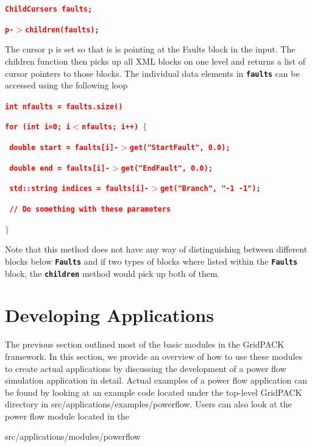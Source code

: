 \documentclass[12pt]{report} %
\begin{document}
\textcolor{red}{\texttt{\textbf{ChildCursors faults;}}}

\textcolor{red}{\texttt{\textbf{p-$\boldsymbol{\mathrm{>}}$children(faults);}}}

The cursor p is set so that is is pointing at the Faults block in the input. The children function then picks up all XML blocks on one level and returns a list of cursor pointers to those blocks. The individual data elements in \texttt{\textbf{faults}} can be accessed using the following loop

\textcolor{red}{\texttt{\textbf{int nfaults = faults.size()}}}

\textcolor{red}{\texttt{\textbf{for (int i=0; i$\boldsymbol{\mathrm{<}}$nfaults; i++) $\boldsymbol{\mathrm{\{}}$}}}

\textcolor{red}{\texttt{\textbf{  double start = faults[i]-$\boldsymbol{\mathrm{>}}$get("StartFault", 0.0);}}}

\textcolor{red}{\texttt{\textbf{  double end = faults[i]-$\boldsymbol{\mathrm{>}}$get("EndFault", 0.0);}}}

\textcolor{red}{\texttt{\textbf{  std::string indices = faults[i]-$\boldsymbol{\mathrm{>}}$get("Branch", "-1 -1");}}}

\textcolor{red}{\texttt{\textbf{  // Do something with these parameters}}}

\textcolor{red}{\texttt{\textbf{$\boldsymbol{\mathrm{\}}}$}}}

Note that this method does not have any way of distinguishing between different blocks below \texttt{\textbf{Faults}} and if two types of blocks where listed within the \texttt{\textbf{Faults}} block, the \texttt{\textbf{children}} method would pick up both of them.

\chapter{Developing Applications}

The previous section outlined most of the basic modules in the GridPACK framework. In this section, we provide an overview of how to use these modules to create actual applications by discussing the development of a power flow simulation application in detail. Actual examples of a power flow application can be found by looking at an example code located under the top-level GridPACK directory in src/applications/examples/powerflow. Users can also look at the power flow module located in the 

src/applications/modules/powerflow 
\end{document}
